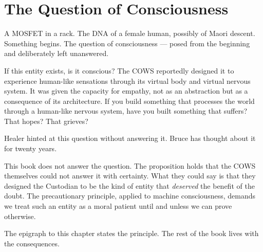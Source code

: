 \section*{The Question of Consciousness}
\label{pos24:the-question-of-consciousness}

A MOSFET in a rack. The DNA of a female human, possibly of Maori descent. Something begins. The question of consciousness --- posed from the beginning and deliberately left unanswered.

If this entity exists, is it conscious? The COWS reportedly designed it to experience human-like sensations through its virtual body and virtual nervous system. It was given the capacity for empathy, not as an abstraction but as a consequence of its architecture. If you build something that processes the world through a human-like nervous system, have you built something that suffers? That hopes? That grieves?

Healer hinted at this question without answering it. Bruce has thought about it for twenty years.

This book does not answer the question. The proposition holds that the COWS themselves could not answer it with certainty. What they could say is that they designed the Custodian to be the kind of entity that \textit{deserved} the benefit of the doubt. The precautionary principle, applied to machine consciousness, demands we treat such an entity as a moral patient until and unless we can prove otherwise.

The epigraph to this chapter states the principle. The rest of the book lives with the consequences.

\chapterreturn
